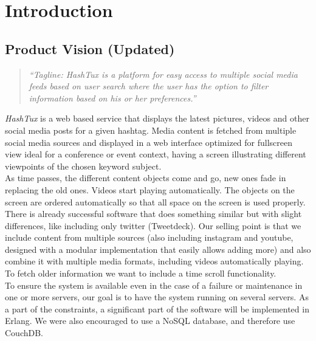 \chapter{Introduction}

\section{Product Vision (Updated)}
\begin{quote}
\textit{``Tagline: HashTux is a platform for easy access to multiple social
media feeds based on user search where the user has the option to filter
information based on his or her preferences.''}
\end{quote}
{\it HashTux} is a web based service that displays the latest pictures, videos
and other social media posts for a given hashtag. Media content is fetched from
multiple social media sources and displayed in a web interface optimized for
fullscreen view ideal for a conference or event context, having a screen
illustrating different viewpoints of the chosen keyword subject. \\

As time passes, the different content objects come and go, new ones fade in
replacing the old ones. Videos start playing automatically. The objects on the
screen are ordered automatically so that all space on the screen is used
properly. \\

There is already successful software that does something similar but with slight
differences, like including only twitter (Tweetdeck). Our selling point is that
we include content from multiple sources (also including instagram and youtube,
designed with a modular implementation that easily allows adding more) and also
combine it with multiple media formats, including videos automatically playing.
To fetch older information we want to include a time scroll functionality. \\

To ensure the system is available even in the case of a failure or maintenance
in one or more servers, our goal is to have the system running on several
servers. As a part of the constraints, a significant part of the software will
be implemented in Erlang. We were also encouraged to use a NoSQL database, and
therefore use CouchDB. \newpage

